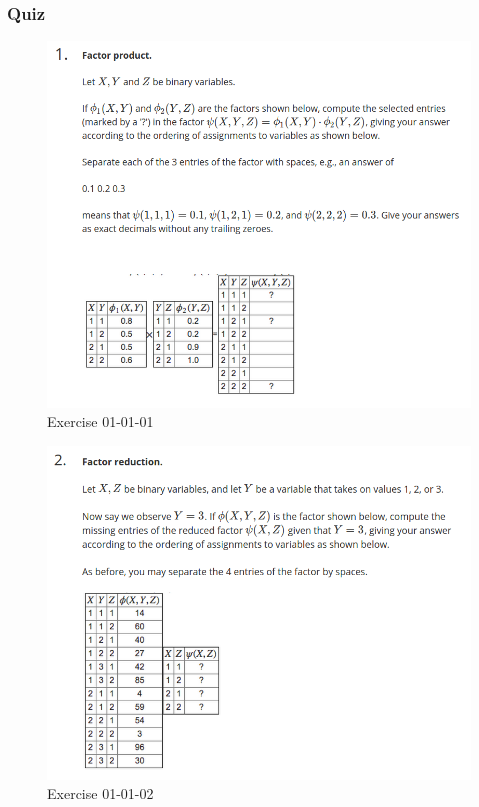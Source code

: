 \documentclass[12pt]{article}
\numberwithin{equation}{section}
\begin{document}

\subsubsection{Quiz}
\begin{figure}[H]
  \includegraphics[width=\linewidth]{PGMpics/01-01-01.png}
  \caption{Exercise 01-01-01}
  \label{fig:01-01-01}
\end{figure}

\begin{figure}[H]
  \includegraphics[width=\linewidth]{PGMpics/01-01-02.png}
  \caption{Exercise 01-01-02}
  \label{fig:01-01-02}
\end{figure}
\end{document}
